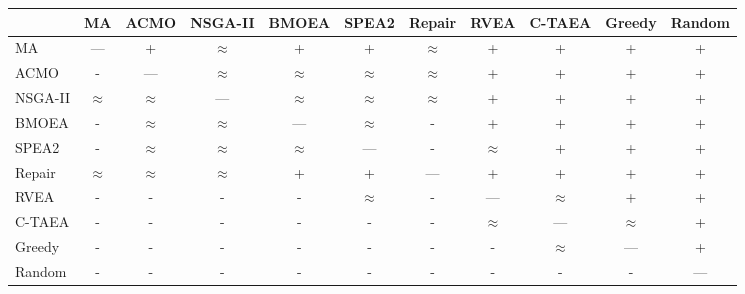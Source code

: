 \begin{tabular}{@{}lcccccccccc@{}}
\toprule
 & MA & ACMO & NSGA-II & BMOEA & SPEA2 & Repair & RVEA & C-TAEA & Greedy & Random \\
\midrule
MA & --- & + & $\approx$ & + & + & $\approx$ & + & + & + & + \\
ACMO & - & --- & $\approx$ & $\approx$ & $\approx$ & $\approx$ & + & + & + & + \\
NSGA-II & $\approx$ & $\approx$ & --- & $\approx$ & $\approx$ & $\approx$ & + & + & + & + \\
BMOEA & - & $\approx$ & $\approx$ & --- & $\approx$ & - & + & + & + & + \\
SPEA2 & - & $\approx$ & $\approx$ & $\approx$ & --- & - & $\approx$ & + & + & + \\
Repair & $\approx$ & $\approx$ & $\approx$ & + & + & --- & + & + & + & + \\
RVEA & - & - & - & - & $\approx$ & - & --- & $\approx$ & + & + \\
C-TAEA & - & - & - & - & - & - & $\approx$ & --- & $\approx$ & + \\
Greedy & - & - & - & - & - & - & - & $\approx$ & --- & + \\
Random & - & - & - & - & - & - & - & - & - & --- \\
\bottomrule
\end{tabular}